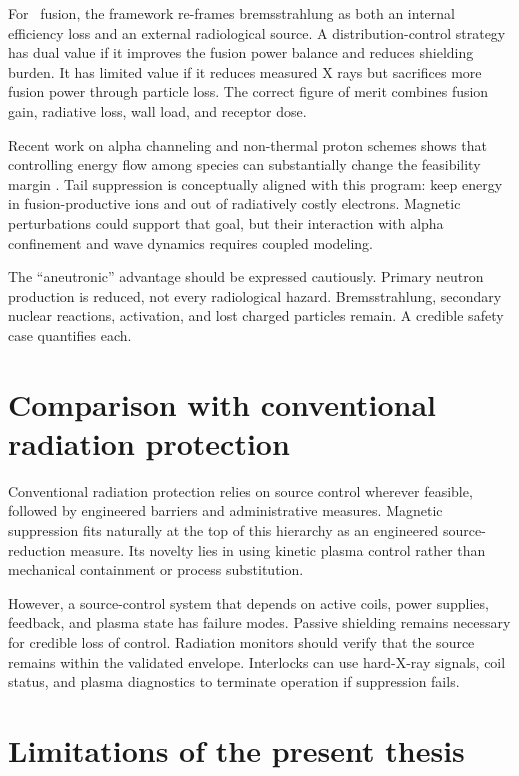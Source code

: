 For \pB \ fusion, the framework re-frames bremsstrahlung as both an internal efficiency loss and an external radiological source. A distribution-control strategy has dual value if it improves the fusion power balance and reduces shielding burden. It has limited value if it reduces measured X rays but sacrifices more fusion power through particle loss. The correct figure of merit combines fusion gain, radiative loss, wall load, and receptor dose.

Recent work on alpha channeling and non-thermal proton schemes shows that controlling energy flow among species can substantially change the feasibility margin \cite{ochs2022}. Tail suppression is conceptually aligned with this program: keep energy in fusion-productive ions and out of radiatively costly electrons. Magnetic perturbations could support that goal, but their interaction with alpha confinement and wave dynamics requires coupled modeling.

The ``aneutronic'' advantage should be expressed cautiously. Primary neutron production is reduced, not every radiological hazard. Bremsstrahlung, secondary nuclear reactions, activation, and lost charged particles remain. A credible safety case quantifies each.

\section{Comparison with conventional radiation protection}

Conventional radiation protection relies on source control wherever feasible, followed by engineered barriers and administrative measures. Magnetic suppression fits naturally at the top of this hierarchy as an engineered source-reduction measure. Its novelty lies in using kinetic plasma control rather than mechanical containment or process substitution.

However, a source-control system that depends on active coils, power supplies, feedback, and plasma state has failure modes. Passive shielding remains necessary for credible loss of control. Radiation monitors should verify that the source remains within the validated envelope. Interlocks can use hard-X-ray signals, coil status, and plasma diagnostics to terminate operation if suppression fails.

\section{Limitations of the present thesis}

